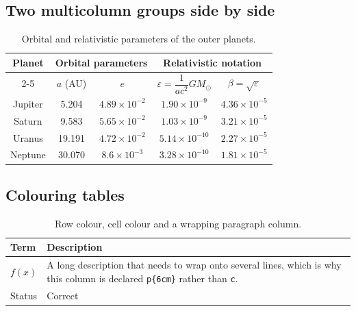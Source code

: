 \documentclass[11pt,a4paper]{article}
\theoremstyle{definition}                   %
\begin{document}
\subsection{Two multicolumn groups side by side}
\begin{table}[H]
    \centering
    \caption{Orbital and relativistic parameters of the outer planets.}
    \label{tab:outer}
    \renewcommand{\arraystretch}{1.5}
    \begin{tabular}{|c|c|c|c|c|}
    \hline
    \multirow{2}{*}{\textbf{Planet}} &
    \multicolumn{2}{c|}{\textbf{Orbital parameters}} &
    \multicolumn{2}{c|}{\textbf{Relativistic notation}} \\
    \cline{2-5}
    & $a$ (AU) & $e$ & $\varepsilon = \dfrac{1}{ac^2}GM_{\odot}$ & $\beta = \sqrt{\varepsilon}$ \\
    \hline
    Jupiter & 5.204  & $4.89 \times 10^{-2}$ & $1.90 \times 10^{-9}$  & $4.36 \times 10^{-5}$ \\
    \hline
    Saturn  & 9.583  & $5.65 \times 10^{-2}$ & $1.03 \times 10^{-9}$  & $3.21 \times 10^{-5}$ \\
    \hline
    Uranus  & 19.191 & $4.72 \times 10^{-2}$ & $5.14 \times 10^{-10}$ & $2.27 \times 10^{-5}$ \\
    \hline
    Neptune & 30.070 & $8.6  \times 10^{-3}$ & $3.28 \times 10^{-10}$ & $1.81 \times 10^{-5}$ \\
    \hline
    \end{tabular}
\end{table}

\subsection{Colouring tables}
%
\begin{table}[H]
    \centering
    \caption{Row colour, cell colour and a wrapping paragraph column.}
    \label{tab:colour}
    \begin{tabular}{|l|p{6cm}|}
    \hline
    \rowcolor{gray!25}
    \textbf{Term} & \textbf{Description} \\
    \hline
    $f(x)$ & \cellcolor{blue!10} A long description that needs to wrap onto
    several lines, which is why this column is declared \texttt{p\{6cm\}}
    rather than \texttt{c}. \\
    \hline
    Status & \cellcolor{softgreen}Correct \\
    \hline
    \end{tabular}
\end{table}
\end{document}
